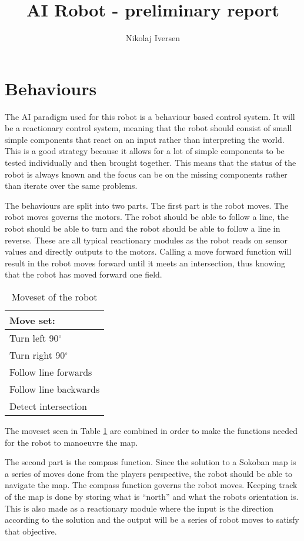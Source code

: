 \documentclass[a4paper,10pt]{article}
\title{AI Robot - preliminary report}
\author{Nikolaj Iversen}
\begin{document}
\maketitle

\section{Behaviours}
The AI paradigm used for this robot is a behaviour based control system.
It will be a reactionary control system, meaning that the robot should consist of small  simple components that react on an input rather than interpreting the world.
This is a good strategy because it allows for a lot of simple components to be tested individually and then brought together.
This means that the status of the robot is always known and the focus can be on the missing components rather than iterate over the same problems.

The behaviours are split into two parts.
The first part is the robot moves. 
The robot moves governs the motors. 
The robot should be able to follow a line, the robot should be able to turn and the robot should be able to follow a line in reverse.
These are all typical reactionary modules as the robot reads on sensor values and directly outputs to the motors.
Calling a move forward function will result in the robot moves forward until it meets an intersection, thus knowing that the robot has moved forward one field.

\begin{table}[h!]
\centering
 \begin{tabular}{|l|}
  \hline
  Move set: \\
  \hline
   Turn left 90$^{\circ}$ \\
   Turn right 90$^{\circ}$\\
   Follow line forwards\\
   Follow line backwards\\
   Detect intersection \\
   \hline
 \end{tabular}
\caption{Moveset of the robot}
\label{tab:movset}
\end{table}

The moveset seen in Table \ref{tab:movset} are combined in order to make the functions needed for the robot to manoeuvre the map.

The second part is the compass function.
Since the solution to a Sokoban map is a series of moves done from the players perspective, the robot should be able to navigate the map.
The compass function governs the robot moves.
Keeping track of the map is done by storing what is ``north'' and what the robots orientation is.
This is also made as a reactionary module where the input is the direction according to the solution and the output will be a series of robot moves to satisfy that objective.
\end{document}
